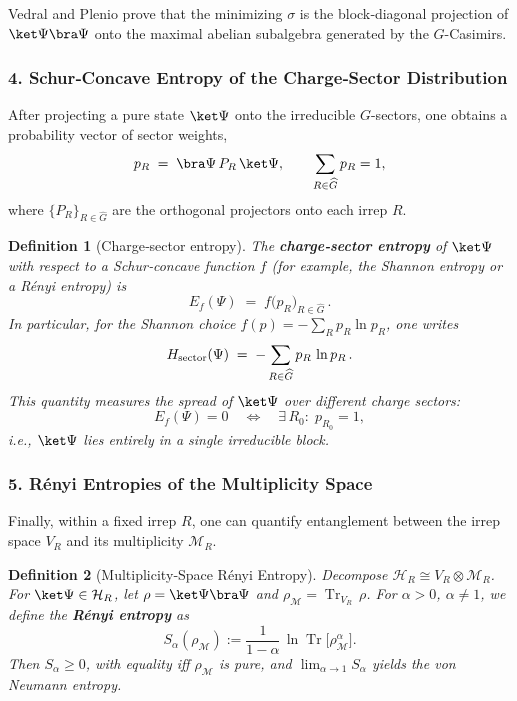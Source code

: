 \documentclass[12pt,a4paper]{article}
\newtheorem{definition}{Definition}
\begin{document}
Vedral and Plenio \cite{VedralPlenio1998} prove that the minimizing $\sigma$ is the block‐diagonal projection of $\ket\Psi\bra\Psi$ onto the maximal abelian subalgebra generated by the $G$-Casimirs.



\subsubsection*{4. Schur‐Concave Entropy of the Charge‐Sector Distribution}

After projecting a pure state $\ket\Psi$ onto the irreducible $G$-sectors, one obtains a probability vector of sector weights,
\[
p_R \;=\;\bra\Psi\,P_R\,\ket\Psi,
\qquad
\sum_{R\in\widehat G}p_R=1,
\]
where $\{P_R\}_{R\in\widehat G}$ are the orthogonal projectors onto each irrep $R$.

\begin{definition}[Charge‐sector entropy]
	The \textbf{charge‐sector entropy} of $\ket\Psi$ with respect to a Schur‐concave function $f$ (for example, the Shannon entropy or a Rényi entropy) is
	\[
	E_f(\Psi)
	\;=\;
	f\bigl(p_R\bigr)_{R\in\widehat G}\,.
	\]
	In particular, for the Shannon choice $f(p)=-\sum_R p_R\ln p_R$, one writes
	\[
	H_{\rm sector}(\Psi)
	\;=\;
	-\sum_{R\in\widehat G} p_R\,\ln p_R\,.
	\]
	This quantity measures the spread of $\ket\Psi$ over different charge sectors:  
	\[
	E_f(\Psi)=0
	\quad\Longleftrightarrow\quad
	\exists\,R_0:\;p_{R_0}=1,
	\]
	i.e., $\ket\Psi$ lies entirely in a single irreducible block.
\end{definition}



\subsubsection*{5. Rényi Entropies of the Multiplicity Space}


Finally, within a fixed irrep $R$, one can quantify entanglement between the irrep space $V_R$ and its multiplicity $\mathcal M_R$.


\begin{definition}[Multiplicity‐Space Rényi Entropy]
	Decompose $\mathcal H_R\cong V_R\otimes\mathcal M_R$.
	For $\ket\Psi\in\mathcal H_R$, let $\rho=\ket\Psi\bra\Psi$ and
	$\rho_{\mathcal M}=\operatorname{Tr}_{V_R}\,\rho$.
	For $\alpha>0$, $\alpha\neq1$, we define the \textbf{Rényi entropy} as
	\[
	S_\alpha(\rho_{\mathcal M})
	:=\frac{1}{1-\alpha}\,\ln\operatorname{Tr}\bigl[\rho_{\mathcal M}^\alpha\bigr].
	\]
	Then $S_\alpha\ge0$, with equality iff $\rho_{\mathcal M}$ is pure, and $\lim_{\alpha\to1}S_\alpha$ yields the von Neumann entropy.
\end{definition}
\end{document}
